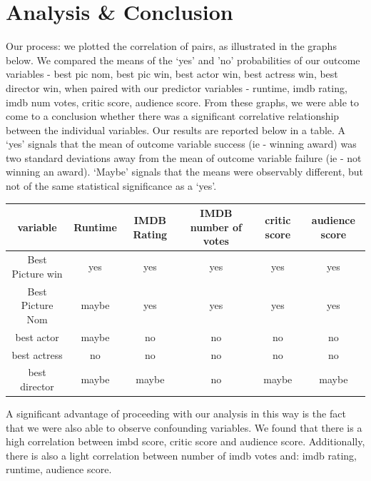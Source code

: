 \documentclass[12pt,letterpaper]{article}
\begin{document}
	\section*{Analysis & Conclusion} 
		\begin{itemize}
Our process: we plotted the correlation of pairs, as illustrated in the graphs below. We compared the means of the ‘yes’ and ’no’ probabilities of our outcome variables - best pic nom, best pic win, best actor win, best actress win, best director win, when paired with our predictor variables - runtime, imdb rating, imdb num votes, critic score, audience score. From these graphs, we were able to come to a conclusion whether there was a significant correlative relationship between the individual variables. Our results are reported below in a table. A ‘yes’ signals that the mean of outcome variable success (ie - winning award) was two standard deviations away from the mean of outcome variable failure (ie - not winning an award). ‘Maybe’ signals that the means were observably different, but not of the same statistical significance as a ‘yes’. 

	\vspace{1cm}

	\begin{table}[h!]
	\centering
	\begin{tabular}{c |c c c c c}
		
		
		variable & Runtime & IMDB Rating & IMDB number of votes & critic score & audience score \\
		\hline
		Best Picture win & yes & yes & yes & yes & yes \\
		Best Picture Nom & maybe & yes & yes &yes& yes \\
		best actor & maybe & no & no & no & no \\
		best actress & no & no & no & no & no\\
		best director & maybe & maybe & no & maybe & maybe
		
	\end{tabular}
\end{table}
	\vspace{1cm}
	
A significant advantage of proceeding with our analysis in this way is the fact that we were also able to observe confounding variables. We found that there is a high correlation between imbd score, critic score and audience score. Additionally, there is also a light correlation between number of imdb votes and: imdb rating, runtime, audience score.


\end{itemize}
\end{document}
